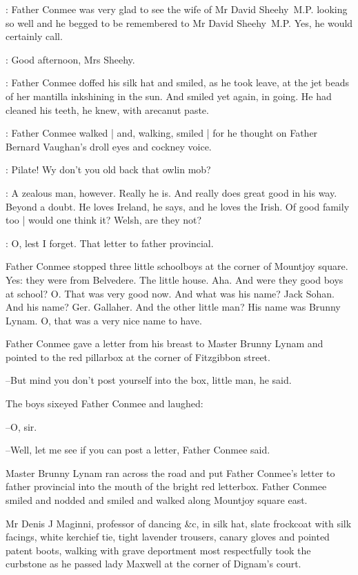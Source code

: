 :
Father Conmee was very glad to see the wife of Mr David Sheehy~M.P.
looking so well and he begged to be remembered to Mr David Sheehy~M.P.
Yes, he would certainly call.

\conmee:
Good afternoon, Mrs Sheehy.


:
Father Conmee doffed his silk hat and smiled,
as he took leave,
at the jet beads of her mantilla inkshining in the sun.
And smiled yet again, in going.
He had cleaned his teeth, he knew, with arecanut paste.

:
Father Conmee walked |
and, walking, smiled |
for he thought on
Father Bernard Vaughan's droll eyes and cockney voice.

\conmee: 
Pilate!
Wy don't you old back that owlin mob?

\conmee:
A zealous man, however.
Really he is.
And really does great good in his way.
Beyond a doubt.
He loves Ireland, he says, and he loves the Irish.
Of good family too |
would one think it?
Welsh, are they not?

\conmee:
O, lest I forget.
That letter to father provincial.

Father Conmee stopped three little schoolboys at the corner of
Mountjoy square. Yes: they were from Belvedere. The little house. Aha.
And were they good boys at school? O. That was very good now. And what
was his name? Jack Sohan. And his name? Ger. Gallaher. And the other
little man? His name was Brunny Lynam. O, that was a very nice name to
have.

Father Conmee gave a letter from his breast to Master Brunny Lynam
and pointed to the red pillarbox at the corner of Fitzgibbon street.

--But mind you don't post yourself into the box, little man, he said.

The boys sixeyed Father Conmee and laughed:

--O, sir.

--Well, let me see if you can post a letter, Father Conmee said.

Master Brunny Lynam ran across the road and put Father Conmee's
letter to father provincial into the mouth of the bright red letterbox.
Father Conmee smiled and nodded and smiled and walked along Mountjoy
square east.

Mr Denis J Maginni, professor of dancing \&c, in silk hat, slate
frockcoat with silk facings, white kerchief tie, tight lavender trousers,
canary gloves and pointed patent boots, walking with grave deportment
most respectfully took the curbstone as he passed lady Maxwell at the
corner of Dignam's court.

